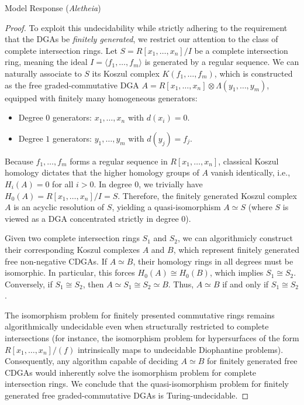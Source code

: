 \documentclass{article}
\theoremstyle{plain}
\theoremstyle{definition}
\newcommand{\Aletheia}{\emph{Aletheia}}
\begin{document}
\begin{solution}{Model Response (\Aletheia)}
\begin{proof}
To exploit this undecidability while strictly adhering to the requirement that the DGAs be \textit{finitely generated}, we restrict our attention to the class of complete intersection rings. Let $S = R[x_1, \dots, x_n] / I$ be a complete intersection ring, meaning the ideal $I = \langle f_1, \dots, f_m \rangle$ is generated by a regular sequence. We can naturally associate to $S$ its Koszul complex $K(f_1, \dots, f_m)$, which is constructed as the free graded-commutative DGA $A = R[x_1, \dots, x_n] \otimes \Lambda(y_1, \dots, y_m)$, equipped with finitely many homogeneous generators:
\begin{itemize}
    \item Degree $0$ generators: $x_1, \dots, x_n$ with $d(x_i) = 0$.
    \item Degree $1$ generators: $y_1, \dots, y_m$ with $d(y_j) = f_j$.
\end{itemize}
Because $f_1, \dots, f_m$ forms a regular sequence in $R[x_1, \dots, x_n]$, classical Koszul homology dictates that the higher homology groups of $A$ vanish identically, i.e., $H_i(A) = 0$ for all $i > 0$. In degree $0$, we trivially have $H_0(A) = R[x_1, \dots, x_n] / I = S$. Therefore, the finitely generated Koszul complex $A$ is an acyclic resolution of $S$, yielding a quasi-isomorphism $A \simeq S$ (where $S$ is viewed as a DGA concentrated strictly in degree $0$).

Given two complete intersection rings $S_1$ and $S_2$, we can algorithmicly construct their corresponding Koszul complexes $A$ and $B$, which represent finitely generated free non-negative CDGAs.
If $A \simeq B$, their homology rings in all degrees must be isomorphic. In particular, this forces $H_0(A) \cong H_0(B)$, which implies $S_1 \cong S_2$.
Conversely, if $S_1 \cong S_2$, then $A \simeq S_1 \cong S_2 \simeq B$.
Thus, $A \simeq B$ if and only if $S_1 \cong S_2$.

The isomorphism problem for finitely presented commutative rings remains algorithmically undecidable even when structurally restricted to complete intersections (for instance, the isomorphism problem for hypersurfaces of the form $R[x_1, \dots, x_n]/(f)$ intrinsically maps to undecidable Diophantine problems). Consequently, any algorithm capable of deciding $A \simeq B$ for finitely generated free CDGAs would inherently solve the isomorphism problem for complete intersection rings. We conclude that the quasi-isomorphism problem for finitely generated free graded-commutative DGAs is Turing-undecidable.
\end{proof}
\end{solution}
\end{document}

